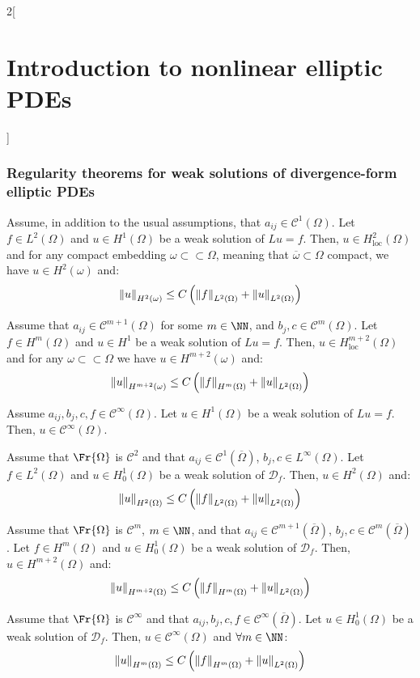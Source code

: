 \documentclass[../../../main_math.tex]{subfiles}
\begin{document}
\begin{multicols}{2}[\section{Introduction to nonlinear elliptic PDEs}]
  \subsubsection{Regularity theorems for weak solutions of divergence-form elliptic PDEs}
  \begin{theorem}
    Assume, in addition to the usual assumptions, that $a_{ij}\in \mathcal{C}^1(\Omega)$. Let $f\in L^2(\Omega)$ and $u\in H^1(\Omega)$ be a weak solution of $Lu=f$. Then, $u\in H^2_{\text{loc}}(\Omega)$ and for any compact embedding $\omega\subset\subset \Omega$, meaning that $\overline{\omega}\subset\Omega$ compact, we have $u\in H^2(\omega)$ and:
    $$
      \norm{u}_{H^2(\omega)}\leq C\left(\norm{f}_{L^2(\Omega)}+\norm{u}_{L^2(\Omega)}\right)
    $$
  \end{theorem}
  \begin{corollary}
    Assume that $a_{ij}\in\mathcal{C}^{m+1}(\Omega)$ for some $m\in\NN$, and $b_j,c\in \mathcal{C}^{m}(\Omega)$. Let $f\in H^{m}(\Omega)$ and $u\in H^1$ be a weak solution of $Lu=f$. Then, $u\in H^{m+2}_{\text{loc}}(\Omega)$ and for any $\omega\subset\subset \Omega$ we have $u\in H^{m+2}(\omega)$ and:
    $$
      \norm{u}_{H^{m+2}(\omega)}\leq C\left(\norm{f}_{H^{m}(\Omega)}+\norm{u}_{L^2(\Omega)}\right)
    $$
  \end{corollary}
  \begin{corollary}
    Assume $a_{ij},b_j,c,f\in\mathcal{C}^\infty(\Omega)$. Let $u\in H^1(\Omega)$ be a weak solution of $Lu=f$. Then, $u\in \mathcal{C}^\infty(\Omega)$.
  \end{corollary}
  \begin{theorem}
    Assume that $\Fr{\Omega}$ is $\mathcal{C}^2$ and that $a_{ij}\in \mathcal{C}^1(\overline{\Omega})$, $b_j,c\in L^\infty(\Omega)$. Let $f\in L^2(\Omega)$ and $u\in H^1_0(\Omega)$ be a weak solution of $\mathcal{D}_f$. Then, $u\in H^2(\Omega)$ and:
    $$
      \norm{u}_{H^2(\Omega)}\leq C\left(\norm{f}_{L^2(\Omega)}+\norm{u}_{L^2(\Omega)}\right)
    $$
  \end{theorem}
  \begin{corollary}
    Assume that $\Fr{\Omega}$ is $\mathcal{C}^{m}$, $m\in\NN$, and that $a_{ij}\in \mathcal{C}^{m+1}(\overline{\Omega})$, $b_j,c\in \mathcal{C}^{m}(\overline{\Omega})$. Let $f\in H^{m}(\Omega)$ and $u\in H^1_0(\Omega)$ be a weak solution of $\mathcal{D}_f$. Then, $u\in H^{m+2}(\Omega)$ and:
    $$
      \norm{u}_{H^{m+2}(\Omega)}\leq C\left(\norm{f}_{H^{m}(\Omega)}+\norm{u}_{L^2(\Omega)}\right)
    $$
  \end{corollary}
  \begin{corollary}
    Assume that $\Fr{\Omega}$ is $\mathcal{C}^\infty$ and that $a_{ij},b_j,c,f\in \mathcal{C}^\infty(\overline{\Omega})$. Let $u\in H^1_0(\Omega)$ be a weak solution of $\mathcal{D}_f$. Then, $u\in \mathcal{C}^\infty(\Omega)$ and $\forall m\in \NN$:
    $$
      \norm{u}_{H^{m}(\Omega)}\leq C\left(\norm{f}_{H^{m}(\Omega)}+\norm{u}_{L^2(\Omega)}\right)
    $$
  \end{corollary}

\end{multicols}
\end{document}
